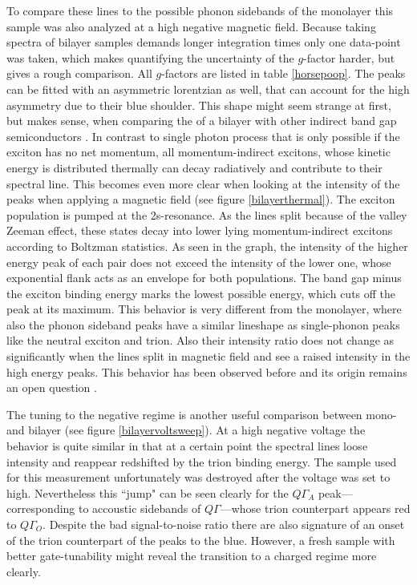 To compare these lines to the possible phonon sidebands of the monolayer this sample was also analyzed at a high negative magnetic field. Because taking spectra of bilayer samples demands longer integration times only one data-point was taken, which makes quantifying the uncertainty of the $g$-factor harder, but gives a rough comparison. All $g$-factors are listed in table \ref{horsepoop}. The peaks can be fitted with an asymmetric lorentzian as well, that can account for the high asymmetry due to their blue shoulder. This shape might seem strange at first, but makes sense, when comparing the \pl of a \wse bilayer with other indirect band gap semiconductors  \cite{pelant_luminescence_2012}. In contrast to single photon process that is only possible if the exciton has no net momentum, all momentum-indirect excitons, whose kinetic energy is distributed thermally can decay radiatively and contribute to their spectral line. This becomes even more clear when looking at the intensity of the peaks when applying a magnetic field (see figure \ref{bilayerthermal}). The exciton population is pumped at the 2s-resonance. As the lines split because of the valley Zeeman effect, these states decay into lower lying momentum-indirect excitons according to Boltzman statistics. As seen in the graph, the intensity of the higher energy peak of each pair does not exceed the intensity of the lower one, whose exponential flank acts as an envelope for both populations. The band gap minus the exciton binding energy marks the lowest possible energy, which cuts off the peak at its maximum. This behavior is very different from the monolayer, where also the phonon sideband peaks have a similar lineshape as single-phonon peaks like the neutral exciton and trion. Also their intensity ratio does not change as significantly when the lines split in magnetic field and see a raised intensity in the high energy peaks. This behavior has been observed before and its origin remains an open question \cite{koperski_optical_2017}.

The tuning to the negative regime is another useful comparison between mono- and bilayer \wse (see figure \ref{bilayervoltsweep}). At a high negative voltage the behavior is quite similar in that at a certain point the spectral lines loose intensity and reappear redshifted by the trion binding energy. The sample used for this measurement unfortunately was destroyed after the voltage was set to high. Nevertheless this ``jump" can be seen clearly for the $Q\Gamma_A$ peak---corresponding to accoustic sidebands of $Q\Gamma$---whose trion counterpart appears red to $Q\Gamma_O$. Despite the bad signal-to-noise ratio there are also signature of an onset of the trion counterpart of the peaks to the blue. However, a fresh sample with better gate-tunability might reveal the transition to a charged regime more clearly. 
